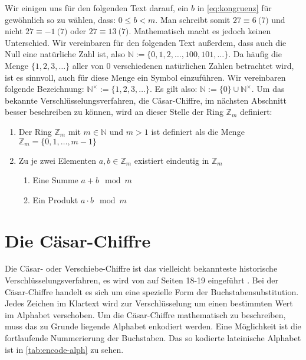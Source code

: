 \noindent
Wir einigen uns für den folgenden Text darauf, ein $b$ in
\eqref{eq:kongruenz} für gewöhn\-lich so zu wählen, dass: $0 \leq b < m$.
Man schreibt somit $27 \equiv 6 \pod{7}$ und nicht $27 \equiv -1 \pod{7}$
oder $27 \equiv 13 \pod{7}$.
Mathematisch macht es jedoch keinen Unterschied.
Wir vereinbaren für den folgenden Text außerdem, dass auch die Null eine natürliche Zahl ist,
also $\mathbb{N} := \{0,1,2,\dots, 100, 101, \dots\}$. Da häufig die Menge
$\{1,2,3,\dots\}$ aller von 0 verschiedenen natürlichen Zahlen betrachtet wird, ist
es sinnvoll, auch für diese Menge ein Symbol einzuführen. Wir vereinbaren folgende
Bezeichnung: $\mathbb{N}^\times := \{1,2,3,\dots\}$.
Es gilt also: $\mathbb{N} := \{0\} \cup \mathbb{N}^\times$.
Um das bekannte Verschlüsselungsverfahren, die Cäsar-Chiffre, im nächsten Abschnitt
besser beschreiben zu können, wird an dieser Stelle der Ring $\mathbb{Z}_m$ definiert:
\newpage

\begin{definition}[Der Ring $\mathbb{Z}_m$ der Reste Modulo $m$]
  \leavevmode
  \begin{enumerate}
    \item Der Ring $\mathbb{Z}_m$ mit $m \in \mathbb{N}$ und $m > 1$ ist
          definiert als die Menge $\mathbb{Z}_m = \{0,1,\dots,m - 1\}$
    \item Zu je zwei Elementen $a,b \in \mathbb{Z}_m$ existiert eindeutig in $\mathbb{Z}_m$
          \begin{enumerate}[topsep=0pt]
            \item Eine Summe $a + b \mod{m}$
            \item Ein Produkt $a \cdot b \mod{m}$
          \end{enumerate}
  \end{enumerate}
\end{definition}

\section{Die Cäsar-Chiffre} \label{sec:shift-cipher}
Die Cäsar- oder Verschiebe-Chiffre ist das vielleicht bekannteste historische Verschlüs\-selungsverfahren,
es wird von \citeauthor{BOOK:crypto} auf Seiten 18-19 eingeführt \parencite*{BOOK:crypto}.
Bei der Cäsar-Chiffre handelt es sich um eine spezielle Form der Buchstabensubstitution.
Jedes Zeichen im Klartext wird zur Verschlüsselung um einen bestimmten Wert
im Alphabet verschoben.
Um die Cäsar-Chiffre mathematisch zu
beschreiben, muss das zu Grunde liegende Alphabet enkodiert werden.
Eine Möglichkeit ist die fortlaufende Nummerierung der Buchstaben. Das so kodierte
lateinische Alphabet ist in \autoref{tab:encode-alph} zu sehen.

